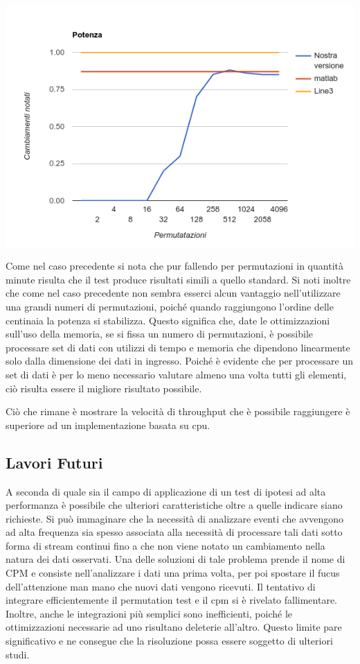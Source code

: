 \includegraphics[width=\linewidth]{potenza}

Come nel caso precedente si nota che pur fallendo per permutazioni in quantità minute risulta che il test produce risultati simili a quello standard. Si noti inoltre che come nel caso precedente non sembra esserci alcun vantaggio nell'utilizzare una grandi numeri di permutazioni, poiché quando raggiungono l'ordine delle centinaia la potenza si stabilizza. Questo significa che, date le ottimizzazioni sull'uso della memoria, se si fissa un numero di permutazioni, è possibile processare set di dati con utilizzi di tempo e memoria che dipendono linearmente solo dalla dimensione dei dati in ingresso. Poiché è evidente che per processare un set di dati è per lo meno necessario valutare almeno una volta tutti gli elementi, ciò risulta essere il migliore risultato possibile. 

Ciò che rimane è mostrare la velocità di throughput che è possibile raggiungere è superiore ad un implementazione basata su cpu.

\subsection{Lavori Futuri}
A seconda di quale sia il campo di applicazione di un test di ipotesi ad alta performanza è possibile che ulteriori caratteristiche oltre a quelle indicare siano richieste. Si può immaginare che la necessità di analizzare eventi che avvengono ad alta frequenza sia spesso associata alla necessità di processare tali dati sotto forma di stream continui fino a che non viene notato un cambiamento nella natura dei dati osservati.
Una delle soluzioni di tale problema prende il nome di CPM e consiste nell'analizzare i dati una prima volta, per poi spostare il fucus dell'attenzione man mano che nuovi dati vengono ricevuti. Il tentativo di integrare efficientemente il permutation test e il cpm si è rivelato fallimentare. Inoltre, anche le integrazioni più semplici sono inefficienti, poiché le ottimizzazioni necessarie ad uno risultano deleterie all'altro. Questo limite pare significativo e ne consegue che la risoluzione possa essere soggetto di ulteriori studi.